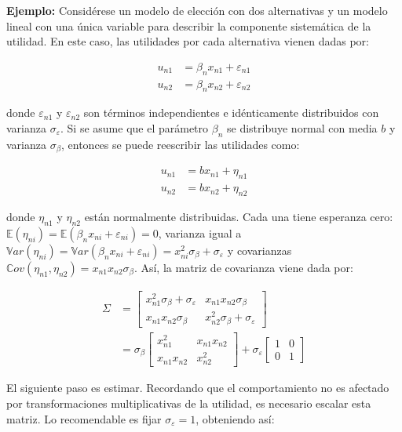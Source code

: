 \documentclass[
]{book}
\begin{document}
\textbf{Ejemplo:} Considérese un modelo de elección con dos alternativas y un modelo lineal con una única variable para describir la componente sistemática de la utilidad. En este caso, las utilidades por cada alternativa vienen dadas por:

\[
\begin{aligned}
u_{n1} &= \beta_n x_{n1} + \varepsilon_{n1}\\
u_{n2} &= \beta_n x_{n2} + \varepsilon_{n2}
\end{aligned}
\]

donde \(\varepsilon_{n1}\) y \(\varepsilon_{n2}\) son términos independientes e idénticamente distribuidos con varianza \(\sigma_\varepsilon\). Si se asume que el parámetro \(\beta_n\) se distribuye normal con media \(b\) y varianza \(\sigma_\beta\), entonces se puede reescribir las utilidades como:

\[
\begin{aligned}
u_{n1} &= b x_{n1} + \eta_{n1}\\
u_{n2} &= b x_{n2} + \eta_{n2}
\end{aligned}
\]

donde \(\eta_{n1}\) y \(\eta_{n2}\) están normalmente distribuidas. Cada una tiene esperanza cero: \(\mathbb{E}(\eta_{ni}) =\mathbb{E}(\beta_nx_{ni} + \varepsilon_{ni}) = 0\), varianza igual a \(\mathbb{V}ar(\eta_{ni}) = \mathbb{V}ar(\beta_n x_{ni} + \varepsilon_{ni}) = x^2_{ni}\sigma_\beta + \sigma_\varepsilon\) y covarianzas \(\mathbb{C}ov(\eta_{n1}, \eta_{n2}) = x_{n1}x_{n2}\sigma_\beta\). Así, la matriz de covarianza viene dada por:

\[
\begin{aligned}
\Sigma &= \begin{bmatrix}x^2_{n1}\sigma_\beta + \sigma_\varepsilon & x_{n1}x_{n2}\sigma_\beta\\
x_{n1}x_{n2}\sigma_\beta & x^2_{n2}\sigma_\beta + \sigma_\varepsilon \end{bmatrix} \\
&= \sigma_\beta \begin{bmatrix}x^2_{n1} & x_{n1}x_{n2}\\
x_{n1}x_{n2} & x^2_{n2} \end{bmatrix} + \sigma_{\varepsilon} \begin{bmatrix}1 & 0\\
0 & 1\end{bmatrix}
\end{aligned}
\]

El siguiente paso es estimar. Recordando que el comportamiento no es afectado por transformaciones multiplicativas de la utilidad, es necesario escalar esta matriz. Lo recomendable es fijar \(\sigma_\varepsilon = 1\), obteniendo así:
\end{document}
